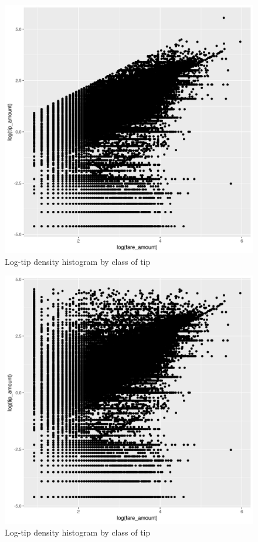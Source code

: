 \documentclass[11pt]{article}
\begin{document}
\begin{figure}[htbp]
\centering
\includegraphics[width=.9\linewidth]{./plots/logFareTipStandardPlot.jpg}
\caption{\label{fig:org22d1ae0}
Log-tip density histogram by class of tip}
\end{figure}

\begin{figure}[htbp]
\centering
\includegraphics[width=.9\linewidth]{./plots/logFareTip100Plot.jpg}
\caption{\label{fig:org07c1870}
Log-tip density histogram by class of tip}
\end{figure}
\end{document}
